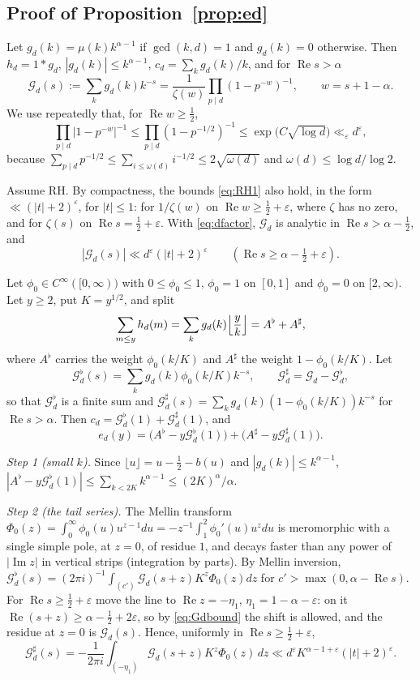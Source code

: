 \documentclass[11pt]{amsart}
\theoremstyle{remark}
\numberwithin{equation}{section}
\newcommand{\cG}{\mathcal{G}}
\newcommand{\eps}{\varepsilon}
\DeclareMathOperator{\re}{Re}
\DeclareMathOperator{\im}{Im}
\begin{document}
\subsection{Proof of Proposition~\ref{prop:ed}}\label{subsec:ed}
Let $g_d(k)=\mu(k)k^{\alpha-1}$ if $\gcd(k,d)=1$ and $g_d(k)=0$ otherwise. Then $h_d=1*g_d$, $|g_d(k)|\le k^{\alpha-1}$, $c_d=\sum_kg_d(k)/k$, and for $\re s>\alpha$
\begin{equation}
\cG_d(s):=\sum_kg_d(k)k^{-s}=\frac1{\zeta(w)}\prod_{p\mid d}(1-p^{-w})^{-1},\qquad w=s+1-\alpha .
\end{equation}
We use repeatedly that, for $\re w\ge\tfrac12$,
\begin{equation}\label{eq:dfactor}
\prod_{p\mid d}\bigl|1-p^{-w}\bigr|^{-1}\le\prod_{p\mid d}(1-p^{-1/2})^{-1}\le\exp\bigl(C\sqrt{\log d}\bigr)\ll_\eps d^{\eps},
\end{equation}
because $\sum_{p\mid d}p^{-1/2}\le\sum_{i\le\omega(d)}i^{-1/2}\le2\sqrt{\omega(d)}$ and $\omega(d)\le\log d/\log2$.

Assume RH. By compactness, the bounds \eqref{eq:RH1} also hold, in the form $\ll(|t|+2)^{\eps}$, for $|t|\le1$: for $1/\zeta(w)$ on $\re w\ge\tfrac12+\eps$, where $\zeta$ has no zero, and for $\zeta(s)$ on $\re s=\tfrac12+\eps$. With \eqref{eq:dfactor}, $\cG_d$ is analytic in $\re s>\alpha-\tfrac12$, and
\begin{equation}\label{eq:Gdbound}
|\cG_d(s)|\ll d^{\eps}(|t|+2)^{\eps}\qquad(\re s\ge\alpha-\tfrac12+\eps).
\end{equation}

Let $\phi_0\in C^\infty([0,\infty))$ with $0\le\phi_0\le1$, $\phi_0=1$ on $[0,1]$ and $\phi_0=0$ on $[2,\infty)$. Let $y\ge2$, put $K=y^{1/2}$, and split
\[
\sum_{m\le y}h_d(m)=\sum_kg_d(k)\Bigl\lfloor\frac yk\Bigr\rfloor=A^\flat+A^\sharp,
\]
where $A^\flat$ carries the weight $\phi_0(k/K)$ and $A^\sharp$ the weight $1-\phi_0(k/K)$. Let
\[
\cG^\flat_d(s)=\sum_kg_d(k)\phi_0(k/K)k^{-s},\qquad \cG^\sharp_d=\cG_d-\cG^\flat_d,
\]
so that $\cG^\flat_d$ is a finite sum and $\cG^\sharp_d(s)=\sum_kg_d(k)(1-\phi_0(k/K))k^{-s}$ for $\re s>\alpha$. Then $c_d=\cG^\flat_d(1)+\cG^\sharp_d(1)$, and
\[
e_d(y)=\bigl(A^\flat-y\cG^\flat_d(1)\bigr)+\bigl(A^\sharp-y\cG^\sharp_d(1)\bigr).
\]

\emph{Step 1 (small $k$).} Since $\lfloor u\rfloor=u-\tfrac12-b(u)$ and $|g_d(k)|\le k^{\alpha-1}$, $|A^\flat-y\cG^\flat_d(1)|\le\sum_{k<2K}k^{\alpha-1}\le(2K)^{\alpha}/\alpha$.

\emph{Step 2 (the tail series).} The Mellin transform $\Phi_0(z)=\int_0^\infty\phi_0(u)u^{z-1}du=-z^{-1}\int_1^2\phi_0'(u)u^zdu$ is meromorphic with a single simple pole, at $z=0$, of residue $1$, and decays faster than any power of $|\im z|$ in vertical strips (integration by parts). By Mellin inversion, $\cG^\flat_d(s)=(2\pi i)^{-1}\int_{(c')}\cG_d(s+z)K^z\Phi_0(z)dz$ for $c'>\max(0,\alpha-\re s)$. For $\re s\ge\tfrac12+\eps$ move the line to $\re z=-\eta_1$, $\eta_1=1-\alpha-\eps$: on it $\re(s+z)\ge\alpha-\tfrac12+2\eps$, so by \eqref{eq:Gdbound} the shift is allowed, and the residue at $z=0$ is $\cG_d(s)$. Hence, uniformly in $\re s\ge\tfrac12+\eps$,
\[
\cG^\sharp_d(s)=-\frac1{2\pi i}\int_{(-\eta_1)}\cG_d(s+z)K^z\Phi_0(z)\,dz\ll d^{\eps}K^{\alpha-1+\eps}(|t|+2)^{\eps}.
\]
\end{document}
